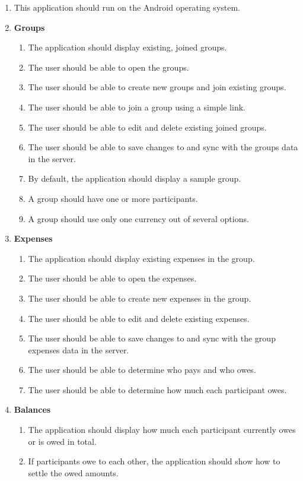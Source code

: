 \documentclass[conference]{IEEEtran}
\begin{document}
\begin{enumerate}
    \item This application should run on the Android operating system.
    \item \textbf{Groups}
        \begin{enumerate}
            \item The application should display existing, joined groups.
            \item The user should be able to open the groups.
            \item The user should be able to create new groups and join existing groups.
            \item The user should be able to join a group using a simple link.
            \item The user should be able to edit and delete existing joined groups.
            \item The user should be able to save changes to and sync with the groups data in the server.
            \item By default, the application should display a sample group.
            \item A group should have one or more participants.
            \item A group should use only one currency out of several options.
        \end{enumerate}
    \item \textbf{Expenses}
        \begin{enumerate}
            \item The application should display existing expenses in the group.
            \item The user should be able to open the expenses.
            \item The user should be able to create new expenses in the group.
            \item The user should be able to edit and delete existing expenses.
            \item The user should be able to save changes to and sync with the group expenses data in the server.
            \item The user should be able to determine who pays and who owes.
            \item The user should be able to determine how much each participant owes.
        \end{enumerate}
    \item \textbf{Balances}
        \begin{enumerate}
            \item The application should display how much each participant currently owes or is owed in total.
            \item If participants owe to each other, the application should show how to settle the owed amounts.
        \end{enumerate}
\end{enumerate}
\end{document}
